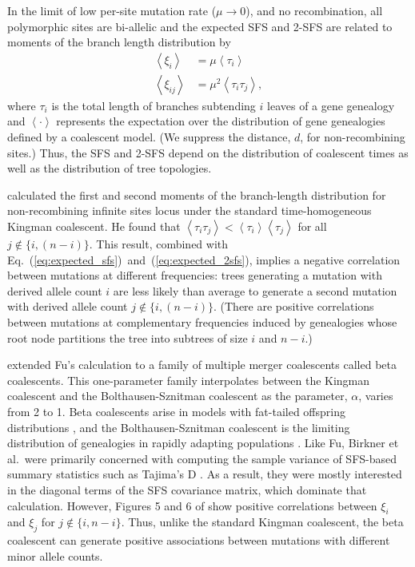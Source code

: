 \documentclass[11pt, letterpaper]{article}   	%
\newcommand{\eqs}[2]{Eq.~(\ref{#1})~and~(\ref{#2})}
\newcommand{\E}[1]{\left< #1 \right>}
\begin{document}
In the limit of low per-site mutation rate ($\mu\to0$), and no recombination, all polymorphic sites are bi-allelic and the expected SFS and 2-SFS are related to moments of the branch length distribution by
\begin{align}
    \E{\xi_i} &= \mu \E{\tau_i} \label{eq:expected_sfs} \\
    \E{\xi_{ij}} &= \mu^2 \E{\tau_i \tau_j},
    \label{eq:expected_2sfs}
\end{align}
where $\tau_i$ is the total length of branches subtending $i$ leaves of a gene genealogy and $\E{\cdot}$ represents the expectation over the distribution of gene genealogies defined by a coalescent model.
(We suppress the distance, $d$, for non-recombining sites.)
Thus, the SFS and 2-SFS depend on the distribution of coalescent times as well as the distribution of tree topologies.

\cite{Fu1995} calculated the first and second moments of the branch-length distribution for non-recombining infinite sites locus under the standard time-homogeneous Kingman coalescent.
He found that $\E{\tau_i \tau_j} < \E{\tau_i}\E{\tau_j}$ for all $j \not\in \{i, (n-i)\}$.
This result, combined with \eqs{eq:expected_sfs}{eq:expected_2sfs}, implies a negative correlation between mutations at different frequencies: trees generating a mutation with derived allele count $i$ are less likely than average to generate a second mutation with derived allele count $j \not\in \{i, (n-i)\}$.
(There are positive correlations between mutations at complementary frequencies induced by genealogies whose root node partitions the tree into subtrees of size $i$ and $n-i$.)

\cite{BirknerEtAl2013} extended Fu's calculation to a family of multiple merger coalescents called beta coalescents.
This one-parameter family interpolates between the Kingman coalescent and the Bolthausen-Sznitman coalescent as the parameter, $\alpha$, varies from 2 to 1.
Beta coalescents arise in models with fat-tailed offspring distributions \autocite{Schweinsberg2003}, and the Bolthausen-Sznitman coalescent is the limiting distribution of genealogies in rapidly adapting populations \autocite{NeherHallatscheck2013}.
Like Fu, Birkner et al.\ were primarily concerned with computing the sample variance of SFS-based summary statistics such as Tajima's D \autocite{Tajima1989}.
As a result, they were mostly interested in the diagonal terms of the SFS covariance matrix, which dominate that calculation.
However, Figures 5 and 6 of \cite{BirknerEtAl2013} show positive correlations between $\xi_i$ and $\xi_j$ for $j \not\in \{i, n-i\}$.
Thus, unlike the standard Kingman coalescent, the beta coalescent can generate positive associations between mutations with different minor allele counts.
\end{document}
